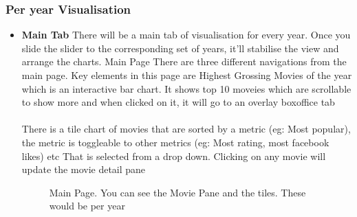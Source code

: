 \documentclass{report}
\begin{document}
\subsubsection{Per year Visualisation}
\begin{itemize}
\item{\textbf{Main Tab}}
There will be a main tab of visualisation for every year. Once you slide the slider to the corresponding set of years, it'll stabilise the view and arrange the charts. Main Page There are three different navigations from the main page.
Key elements in this page are Highest Grossing Movies of the year which is an interactive bar chart. It shows top 10 moveies which are scrollable to show more and when clicked on it, it will go to an overlay boxoffice tab\\\\
There is a tile chart of movies that are sorted by a metric (eg: Most popular), the metric is toggleable to other metrics (eg: Most rating, most facebook likes) etc That is selected from a drop down. Clicking on any movie will update the movie detail pane\\

\begin{figure}[H]
	\caption{Main Page. You can see the Movie Pane and the tiles. These would be per year}
	\label{Fig:1}
\end{figure}


\end{itemize}
\end{document}
